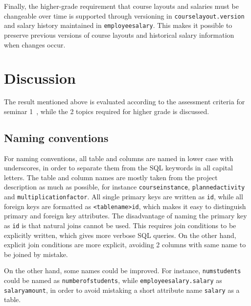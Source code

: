 \documentclass[a4paper]{scrartcl}
\renewcommand{\_}{\textunderscore\allowbreak}
\begin{document}
Finally, the higher-grade requirement that course layouts and salaries must be changeable over time is supported through versioning in \texttt{course\_layout.version} and salary history maintained in \texttt{employee\_salary}. This makes it possible to preserve previous versions of course layouts and historical salary information when changes occur.

\section{Discussion}
\label{sec:discussion}


The result mentioned above is evaluated according to the assessment criteria for seminar 1~\cite{criteria}, while the 2 topics required for higher grade is discussed.

\subsection{Naming conventions}

For naming conventions, all table and columns are named in lower case with underscores, in order to separate them from the SQL keywords in all capital letters. The table and column names are mostly taken from the project description as much as possible, for instance \texttt{course\_instance}, \texttt{planned\_activity} and \texttt{multiplication\_factor}. All single primary keys are written as \texttt{id}, while all foreign keys are formatted as \texttt{<table\_name>\_id}, which makes it easy to distinguish primary and foreign key attributes. The disadvantage of naming the primary key as \texttt{id} is that natural joins cannot be used. This requires join conditions to be explicitly written, which gives more verbose SQL queries. On the other hand, explicit join conditions are more explicit, avoiding 2 columns with same name to be joined by mistake.

On the other hand, some names could be improved. For instance, \texttt{num\_students} could be named as \texttt{number\_of\_students}, while \texttt{employee\_salary.salary} as \texttt{salary\_amount}, in order to avoid mistaking a short attribute name \texttt{salary} as a table.
\end{document}
